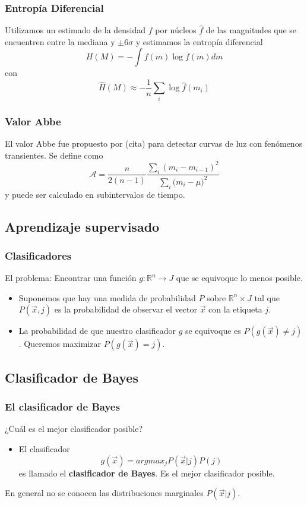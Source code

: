 \documentclass{beamer}
\begin{document}
\begin{frame}
  \frametitle{Entropía Diferencial}
  Utilizamos un estimado de la densidad $f$ por núcleos $\hat{f}$ de las magnitudes que se encuentren entre la mediana y $\pm 6\sigma$ y estimamos la entropía diferencial 
  \begin{equation}
    H(M) = -\int f(m)\log f(m) dm
  \end{equation}
  con 
  \begin{equation}
    \hat{H}(M) \approx -\frac{1}{n}\sum_i\log\hat{f}(m_i)
  \end{equation}
\end{frame}

\begin{frame}
  \frametitle{Valor Abbe}
  El valor Abbe fue propuesto por (cita) para detectar curvas de luz con fenómenos transientes. Se define como
  \begin{equation}
    \mathcal{A}=\frac{n}{2(n-1)}\frac{\sum_{i}{(m_{i}-m_{i-1})^{2}}}{\sum_{i}{(m_{i}-\mu})^2}
  \end{equation}
  y puede ser calculado en subintervalos de tiempo.
\end{frame}

\subsection{Aprendizaje supervisado}
\begin{frame}%
\frametitle{Clasificadores}
El problema: Encontrar una función $g:\mathbb{R}^n\to J  $ que se equivoque lo menos posible.
\begin{itemize}
  \item Suponemos que hay una medida de probabilidad $P$ sobre $\mathbb{R}^n\times J$ tal que $P(\vec{x}, j)$ es la probabilidad de observar el vector $\vec{x}$ con la etiqueta $j$.
  \item La probabilidad de que nuestro clasificador $g$ se equivoque es $P(g(\vec{x}) \neq j)$. Queremos maximizar $P(g(\vec{x}) = j)$.
  \end{itemize}
\end{frame}


\subsection{Clasificador de Bayes}
\begin{frame}%
  \frametitle{El clasificador de Bayes}
  ¿Cuál es el mejor clasificador posible?
  \begin{itemize} 
  \item El clasificador
    \begin{equation}
      g(\vec{x}) = argmax_{j}P(\vec{x}|j)P(j)
    \end{equation}
    es llamado el \textbf{clasificador de Bayes}. Es el mejor clasificador posible.
  \end{itemize}
  En general no se conocen las distribuciones marginales $P(\vec{x}|j)$.
\end{frame}
\end{document}
